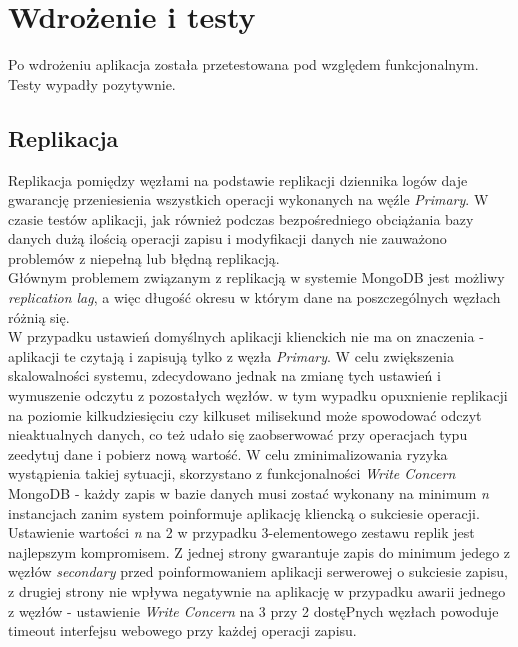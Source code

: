 \section{Wdrożenie i testy}
Po wdrożeniu aplikacja została przetestowana pod względem funkcjonalnym. Testy wypadły pozytywnie.

\subsection{Replikacja}
Replikacja pomiędzy węzłami na podstawie replikacji dziennika logów daje gwarancję przeniesienia wszystkich operacji wykonanych na węźle \textit{Primary}. W czasie testów aplikacji, jak również podczas bezpośredniego obciążania bazy danych dużą ilością operacji zapisu i modyfikacji danych nie zauważono problemów z niepełną lub błędną replikacją. \\
Głównym problemem związanym z replikacją w systemie MongoDB jest możliwy \textit{replication lag}, a więc długość okresu w którym dane na poszczególnych węzłach różnią się. \\
W przypadku ustawień domyślnych aplikacji klienckich nie ma on znaczenia - aplikacji te czytają i zapisują tylko z węzła \textit{Primary}. W celu zwiększenia skalowalności systemu, zdecydowano jednak na zmianę tych ustawień i wymuszenie odczytu z pozostałych węzłów. w tym wypadku opuxnienie replikacji na poziomie kilkudziesięciu czy kilkuset milisekund może spowodować odczyt nieaktualnych danych, co też udało się zaobserwować przy operacjach typu zeedytuj dane i pobierz nową wartość. W celu zminimalizowania ryzyka wystąpienia takiej sytuacji, skorzystano z funkcjonalności \textit{Write Concern} MongoDB - każdy zapis w bazie danych musi zostać wykonany na minimum \textit{n} instancjach zanim system poinformuje aplikację kliencką o sukciesie operacji. Ustawienie wartości \textit{n} na 2 w przypadku 3-elementowego zestawu replik jest najlepszym kompromisem. Z jednej strony gwarantuje zapis do minimum jedego z węzłów \textit{secondary} przed poinformowaniem aplikacji serwerowej o sukciesie zapisu, z drugiej strony nie wpływa negatywnie na aplikację w przypadku awarii jednego z węzłów - ustawienie \textit{Write Concern} na 3 przy 2 dostęPnych węzłach powoduje timeout interfejsu webowego przy każdej operacji zapisu.

